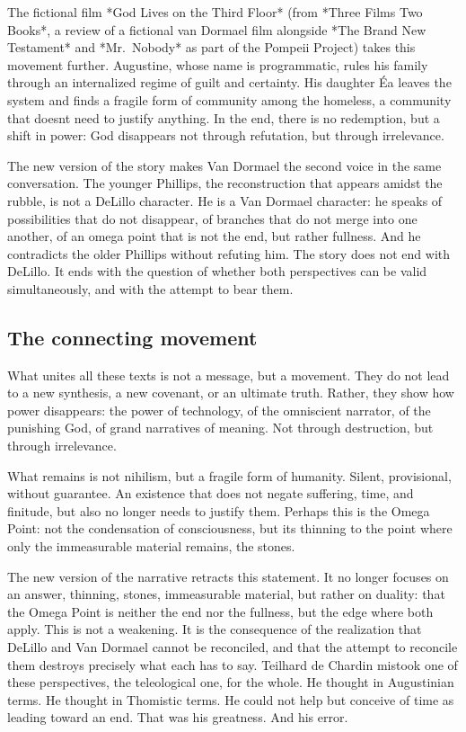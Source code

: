 \documentclass[
  ngerman,
]{article}
\begin{document}
The fictional film *God Lives on the Third Floor* (from *Three Films Two
Books*, a review of a fictional van Dormael film alongside *The Brand
New Testament* and *Mr.~Nobody* as part of the Pompeii Project) takes
this movement further. Augustine, whose name is programmatic, rules his
family through an internalized regime of guilt and certainty. His
daughter Éa leaves the system and finds a fragile form of community
among the homeless, a community that doesn\textquotesingle t need to
justify anything. In the end, there is no redemption, but a shift in
power: God disappears not through refutation, but through irrelevance.

The new version of the story makes Van Dormael the second voice in the
same conversation. The younger Phillips, the reconstruction that appears
amidst the rubble, is not a DeLillo character. He is a Van Dormael
character: he speaks of possibilities that do not disappear, of branches
that do not merge into one another, of an omega point that is not the
end, but rather fullness. And he contradicts the older Phillips without
refuting him. The story does not end with DeLillo. It ends with the
question of whether both perspectives can be valid simultaneously, and
with the attempt to bear them.

\subsection{The connecting movement}\label{the-connecting-movement}

What unites all these texts is not a message, but a movement. They do
not lead to a new synthesis, a new covenant, or an ultimate truth.
Rather, they show how power disappears: the power of technology, of the
omniscient narrator, of the punishing God, of grand narratives of
meaning. Not through destruction, but through irrelevance.

What remains is not nihilism, but a fragile form of humanity. Silent,
provisional, without guarantee. An existence that does not negate
suffering, time, and finitude, but also no longer needs to justify them.
Perhaps this is the Omega Point: not the condensation of consciousness,
but its thinning to the point where only the immeasurable material
remains, the stones.

The new version of the narrative retracts this statement. It no longer
focuses on an answer, thinning, stones, immeasurable material, but
rather on duality: that the Omega Point is neither the end nor the
fullness, but the edge where both apply. This is not a weakening. It is
the consequence of the realization that DeLillo and Van Dormael cannot
be reconciled, and that the attempt to reconcile them destroys precisely
what each has to say. Teilhard de Chardin mistook one of these
perspectives, the teleological one, for the whole. He thought in
Augustinian terms. He thought in Thomistic terms. He could not help but
conceive of time as leading toward an end. That was his greatness. And
his error.
\end{document}
